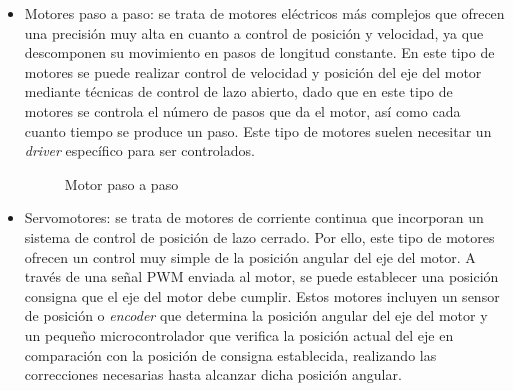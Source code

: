 \begin{itemize}
    \item Motores paso a paso: se trata de motores eléctricos más complejos que ofrecen una precisión muy alta en cuanto a  control de posición y velocidad, ya que descomponen su movimiento en pasos de longitud constante. En este tipo de motores se puede realizar control de velocidad y posición del eje del motor mediante técnicas de control de lazo abierto, dado que en este tipo de motores se controla el número de pasos que da el motor, así como cada cuanto tiempo se produce un paso. Este tipo de motores suelen necesitar un \textit{driver} específico para ser controlados.
    
    \begin{figure}[H]
    \centering
    \caption{Motor paso a paso} \label{fig:lego}
    \end{figure}
  
    \item Servomotores: se trata de motores de corriente continua que incorporan un sistema de control de posición de lazo cerrado. Por ello, este tipo de motores ofrecen un control muy simple de la posición angular del eje del motor. A través de una señal \ac{PWM} enviada al motor, se puede establecer una posición consigna que el eje del motor debe cumplir. Estos motores incluyen un sensor de posición o \textit{encoder} que determina la posición angular del eje del motor y un pequeño microcontrolador que verifica la posición actual del eje en comparación con la posición de consigna establecida, realizando las correcciones necesarias hasta alcanzar dicha posición angular.
    

\end{itemize}

